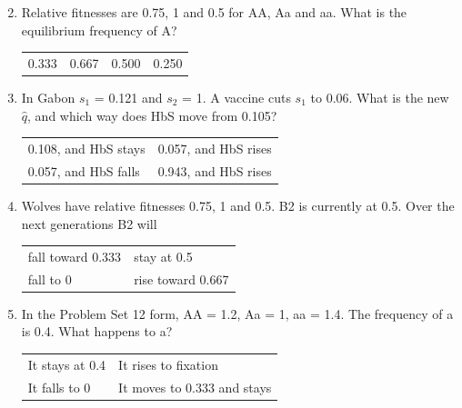 \documentclass[11pt]{article}
\newcommand{\work}[1]{\par\vspace{#1}}
\begin{document}
\begin{enumerate}[label=\textbf{\arabic*.}, leftmargin=2em, itemsep=1.4em]
\begin{tabularx}{\linewidth}{@{}YYYY@{}}
\end{tabularx}
\work{1.6cm}
\item Relative fitnesses are 0.75, 1 and 0.5 for AA, Aa and aa. What is the equilibrium frequency of A?
\par\smallskip\noindent\begin{tabularx}{\linewidth}{@{}YYYY@{}}
0.333 & 0.667 & 0.500 & 0.250 \\
\end{tabularx}
\work{1.6cm}
\item In Gabon \(s_1\) = 0.121 and \(s_2\) = 1. A vaccine cuts \(s_1\) to 0.06. What is the new \(\hat{q}\), and which way does HbS move from 0.105?
\par\smallskip\noindent\begin{tabularx}{\linewidth}{@{}YY@{}}
0.108, and HbS stays & 0.057, and HbS rises \\[3pt]
0.057, and HbS falls & 0.943, and HbS rises \\
\end{tabularx}
\work{1.6cm}
\item Wolves have relative fitnesses 0.75, 1 and 0.5. B2 is currently at 0.5. Over the next generations B2 will
\par\smallskip\noindent\begin{tabularx}{\linewidth}{@{}YY@{}}
fall toward 0.333 & stay at 0.5 \\[3pt]
fall to 0 & rise toward 0.667 \\
\end{tabularx}
\work{1.6cm}
\item In the Problem Set 12 form, AA = 1.2, Aa = 1, aa = 1.4. The frequency of a is 0.4. What happens to a?
\par\smallskip\noindent\begin{tabularx}{\linewidth}{@{}YY@{}}
It stays at 0.4 & It rises to fixation \\[3pt]
It falls to 0 & It moves to 0.333 and stays \\
\end{tabularx}

\end{enumerate}
\end{document}
